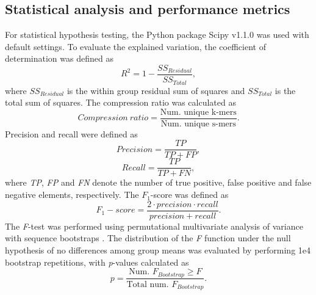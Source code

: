 \documentclass[sigconf]{acmart}
\begin{document}
\subsection{Statistical analysis and performance metrics}
For statistical hypothesis testing, the Python package Scipy v1.1.0 was used with default settings. To evaluate the explained variation, the coefficient of determination was defined as
\begin{equation}
R^2=1-\frac{SS_{Residual}}{SS_{Total}},
\end{equation}
where \(SS_{Residual}\) is the within group residual sum of squares and \(SS_{Total}\) is the total sum of squares. The compression ratio was calculated as
\begin{equation}
Compression\: ratio = \frac{\textrm{Num. unique k-mers}}{\textrm{Num. unique s-mers}}.
\end{equation}
Precision and recall were defined as 
\begin{equation}
Precision = \frac{TP}{TP+FP},
\end{equation}
\begin{equation}
Recall = \frac{TP}{TP+FN},
\end{equation}
where \textit{TP}, \textit{FP} and \textit{FN} denote the number of true positive, false positive and false negative elements, respectively. The $F_1$-score was defined as 
\begin{equation}
F_1-score = \frac{2\cdot precision\cdot recall}{precision+recall}.
\end{equation}
The \textit{F}-test was performed using permutational multivariate analysis of variance with sequence bootstraps \cite{Anderson2001-zz,Zrimec2018-lx}. The distribution of the \textit{F} function under the null hypothesis of no differences among group means was evaluated by performing 1e4 bootstrap repetitions, with \textit{p}-values calculated as
\begin{equation}
p = \frac{\textrm{Num. }F_{Bootstrap}\geq F}{\textrm{Total num. }F_{Bootstrap}}.
\end{equation}
\end{document}
